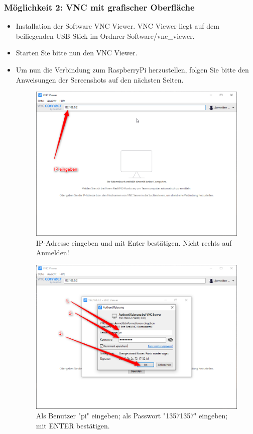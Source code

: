 \documentclass{article}
\begin{document}
\subsubsection{Möglichkeit 2: VNC mit grafischer Oberfläche}
\begin{itemize}
	\item Installation der Software VNC Viewer. VNC Viewer liegt auf dem beiliegenden USB-Stick im Ordnrer Software/vnc\_viewer.
	\item Starten Sie bitte nun den VNC Viewer.
	\item Um nun die Verbindung zum RaspberryPi herzustellen, folgen Sie bitte den Anweisungen der Screenshots auf den nächsten Seiten.
\begin{figure}[h]
  \caption{IP-Adresse eingeben und mit Enter bestätigen. Nicht rechts auf Anmelden!}
  \centering
    \includegraphics[width=1\textwidth]{vnc.png}
\end{figure}
\begin{figure}
  \caption{Als Benutzer "pi" eingeben; als Passwort "13571357" eingeben; mit ENTER bestätigen.}
  \centering
    \includegraphics[width=1\textwidth]{vnc2.png}

\end{figure}
\end{itemize}
\end{document}

